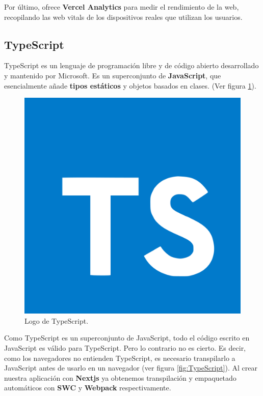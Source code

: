 \documentclass[12pt,twoside,titlepage]{report}
\begin{document}
Por último, ofrece \textbf{Vercel Analytics} para medir el rendimiento de la web, recopilando las web vitals de los dispositivos reales que utilizan los usuarios.

\subsection{TypeScript}

TypeScript es un lenguaje de programación libre y de código abierto desarrollado y mantenido por Microsoft. Es un superconjunto de \textbf{JavaScript}, que esencialmente añade \textbf{tipos estáticos} y objetos basados en clases.
(Ver figura \ref{fig:TypeScriptLogo}).

\begin{figure}[H]
    \centering
    \includegraphics[scale=0.03]{TypeScript/TypeScript}
    \caption{Logo de TypeScript.}
    \label{fig:TypeScriptLogo}
\end{figure}

Como TypeScript es un superconjunto de JavaScript, todo el código escrito en JavaScript es válido para TypeScript. Pero lo contrario no es cierto. Es decir, como los navegadores no entienden TypeScript, es necesario transpilarlo a JavaScript antes de usarlo en un navegador (ver figura \ref{fig:TypeScript}). Al crear nuestra aplicación con \textbf{Nextjs} ya obtenemos transpilación y empaquetado automáticos con \textbf{SWC} y \textbf{Webpack} respectivamente.
\end{document}
